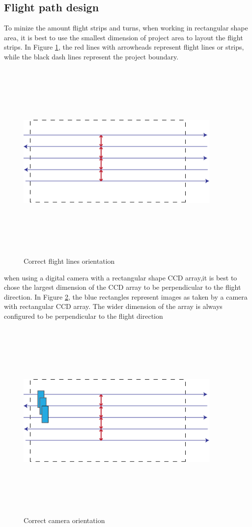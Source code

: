 \subsection{Flight path design}
To minize the amount flight strips and turns, when working in rectangular shape area, it is best to use the smallest dimension of project area to layout the flight strips. In Figure \ref{fig:line_orientaion}, the red lines with arrowheads represent flight lines or strips, while the black dash lines represent the project boundary.
\begin{figure}[h]
\centering
\includegraphics[width=10cm,height=10cm,keepaspectratio]{imagenes/Fligth_path.png}
\caption{Correct flight lines orientation}
\label{fig:line_orientaion}
\end{figure}
when using a digital camera with a rectangular shape CCD array,it is best to chose the largest dimension of the CCD array to be perpendicular to the flight direction. In Figure \ref{fig:camera_orientaion}, the blue rectangles represent images as taken by a camera with rectangular CCD array. The wider dimension of the array is always configured to be perpendicular to the flight direction\cite{GCP}
\begin{figure}[H]
\centering
\includegraphics[width=10cm,height=10cm,keepaspectratio]{imagenes/Camera_Orientation.png}
\caption{Correct camera orientation}
\label{fig:camera_orientaion}
\end{figure}
